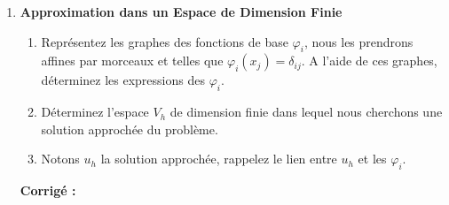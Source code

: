 \documentclass[a4paper,12pt]{article}
\newif\ifcorriges
\newenvironment{solution}
  {
    \ifcorriges
      \begin{framed}
      \par\noindent\textbf{Corrigé :} 
  }
  {
      \end{framed}
    \fi
  }
\begin{document}
\begin{enumerate}
    
    \item \textbf{Approximation dans un Espace de Dimension Finie}
    \begin{enumerate}
        \item Représentez les graphes des fonctions de base \( \varphi_i \), nous les prendrons affines par morceaux et telles que \( \varphi_i(x_j) = \delta_{ij} \). A l'aide de ces graphes, déterminez les expressions des \( \varphi_i \).
        
        \item Déterminez l'espace \( V_h \) de dimension finie dans lequel nous cherchons une solution approchée du problème.
        
        \item Notons \( u_h \) la solution approchée, rappelez le lien entre \( u_h \) et les \( \varphi_i \).
        
    \end{enumerate}
    
        \ifcorriges
        \begin{solution}


\end{solution}
\end{enumerate}
\end{document}
